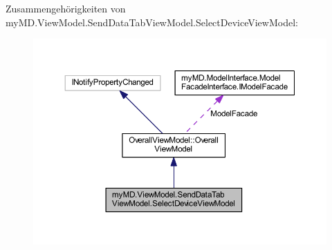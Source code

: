 Zusammengehörigkeiten von my\+M\+D.\+View\+Model.\+Send\+Data\+Tab\+View\+Model.\+Select\+Device\+View\+Model\+:\nopagebreak
\begin{figure}[H]
\begin{center}
\leavevmode
\includegraphics[width=350pt]{classmy_m_d_1_1_view_model_1_1_send_data_tab_view_model_1_1_select_device_view_model__coll__graph}
\end{center}
\end{figure}
